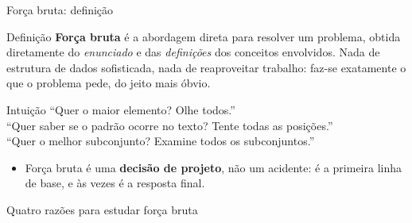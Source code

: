 \documentclass[aspectratio=169]{beamer}
\begin{document}
\begin{frame}{Força bruta: definição}
  \begin{block}{Definição}
    \textbf{Força bruta} é a abordagem direta para resolver um problema, obtida
    diretamente do \emph{enunciado} e das \emph{definições} dos conceitos envolvidos.
    Nada de estrutura de dados sofisticada, nada de reaproveitar trabalho: faz-se
    exatamente o que o problema pede, do jeito mais óbvio.
  \end{block}
  \begin{exampleblock}{Intuição}
    ``Quer o maior elemento? Olhe todos.''\\
    ``Quer saber se o padrão ocorre no texto? Tente todas as posições.''\\
    ``Quer o melhor subconjunto? Examine todos os subconjuntos.''
  \end{exampleblock}
  \begin{itemize}
    \item Força bruta é uma \textbf{decisão de projeto}, não um acidente: é a
      primeira linha de base, e às vezes é a resposta final.
  \end{itemize}
\end{frame}

\begin{frame}{Quatro razões para estudar força bruta}
  \begin{center}
  \end{center}
\end{frame}
\end{document}
